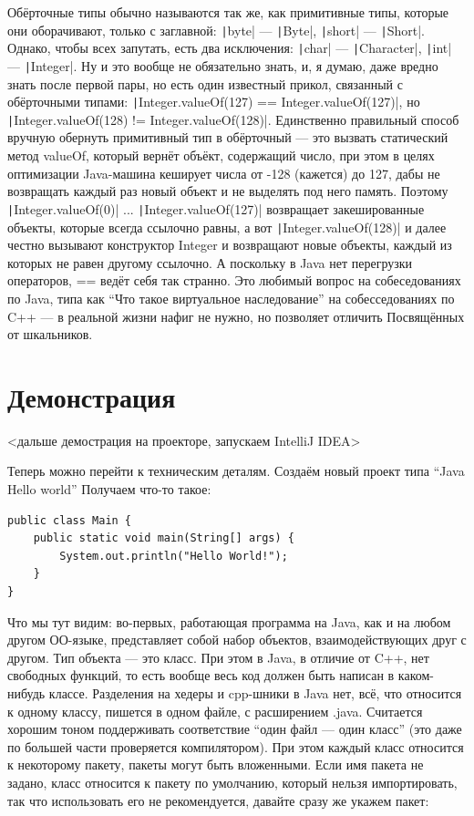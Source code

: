 \documentclass[a5paper]{article}
\begin{document}
Обёрточные типы обычно называются так же, как примитивные типы, которые они оборачивают, только с заглавной: \texttt|byte| --- \texttt|Byte|, \texttt|short| --- \texttt|Short|. Однако, чтобы всех запутать, есть два исключения: \texttt|char| --- \texttt|Character|, \texttt|int| --- \texttt|Integer|. Ну и это вообще не обязательно знать, и, я думаю, даже вредно знать после первой пары, но есть один известный прикол, связанный с обёрточными типами: \texttt|Integer.valueOf(127) == Integer.valueOf(127)|, но \texttt|Integer.valueOf(128) != Integer.valueOf(128)|. Единственно правильный способ вручную обернуть примитивный тип в обёрточный --- это вызвать статический метод valueOf, который вернёт объёкт, содержащий число, при этом в целях оптимизации Java-машина кеширует числа от -128 (кажется) до 127, дабы не возвращать каждый раз новый объект и не выделять под него память. Поэтому \texttt|Integer.valueOf(0)| ... \texttt|Integer.valueOf(127)| возвращает закешированные объекты, которые всегда ссылочно равны, а вот \texttt|Integer.valueOf(128)| и далее честно вызывают конструктор Integer и возвращают новые объекты, каждый из которых не равен другому ссылочно. А поскольку в Java нет перегрузки операторов, == ведёт себя так странно. Это любимый вопрос на собеседованиях по Java, типа как ``Что такое виртуальное наследование'' на собесседованиях по C++ --- в реальной жизни нафиг не нужно, но позволяет отличить Посвящённых от шкальников.

\section{Демонстрация}

<дальше демострация на проекторе, запускаем IntelliJ IDEA>

Теперь можно перейти к техническим деталям. Создаём новый проект типа ``Java Hello world'' Получаем что-то такое:

\begin{verbatim}
public class Main {
    public static void main(String[] args) {
        System.out.println("Hello World!");
    }
}
\end{verbatim}

Что мы тут видим: во-первых, работающая программа на Java, как и на любом другом ОО-языке, представляет собой набор объектов, взаимодействующих друг с другом. Тип объекта --- это класс. При этом в Java, в отличие от C++, нет свободных функций, то есть вообще весь код должен быть написан в каком-нибудь классе. Разделения на хедеры и cpp-шники в Java нет, всё, что относится к одному классу, пишется в одном файле, с расширением .java. Считается хорошим тоном поддерживать соответствие ``один файл --- один класс'' (это даже по большей части проверяется  компилятором). При этом каждый класс относится к некоторому пакету, пакеты могут быть вложенными. Если имя пакета не задано, класс относится к пакету по умолчанию, который нельзя импортировать, так что использовать его не рекомендуется, давайте сразу же укажем пакет:
\end{document}

